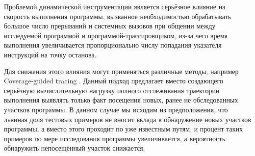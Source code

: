 Проблемой динамической инструментации является серьёзное влияние на скорость выполнения программы, вызванное необходимостью обрабатывать большое число прерываний и системных вызовов при общении между исследуемой программой и программой-трассировщиком, из-за чего время выполнения увеличивается пропорционально числу попадания указателя инструкций на точку останова.

Для снижения этого влияния могут применяться различные методы, например Coverage-guided tracing \cite{full-speed-fuzzing}. Данный подход предлагает вместо создающего серьёзную вычислительную нагрузку полного отслеживания траектории выполнения выявлять только факт посещения новых, ранее не обследованных участков программы. В данном случае мы исходим из предположения, что львиная доля тестовых примеров не вносит вклада в обнаружение новых участков программы, а вместо этого проходит по уже известным путям, и процент таких примеров по мере исследования программы увеличивается, а вероятность обнаружить непосещённый участок снижается.
